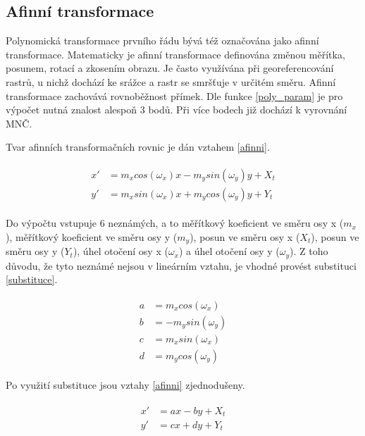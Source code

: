 \documentclass[thesis=M,czech]{FITthesis}[2012/06/26]
\begin{document}
\subsection{Afinní transformace}
Polynomická transformace prvního řádu bývá též označována jako afinní transformace. Matematicky je afinní transformace definována změnou měřítka, posunem, rotací a zkosením obrazu. Je často využívána při georeferencování rastrů, u nichž dochází ke srážce a rastr se smršťuje v určitém směru. Afinní transformace zachovává rovnoběžnost přímek. Dle funkce \eqref{poly_param} je pro výpočet nutná znalost alespoň 3 bodů.  Při více bodech již dochází k vyrovnání MNČ. 

Tvar afinních transformačních rovnic je dán vztahem \eqref{afinni}.

\begin{align}  \label{afinni} 
\begin{split}
x' &= m_x cos(\omega_x) x - m_y sin(\omega_y) y + X_t \\
y' &= m_x sin(\omega_x) x + m_y cos(\omega_y) y + Y_t
\end{split}
\end{align}

Do výpočtu vstupuje 6 neznámých, a to měřítkový koeficient ve směru osy x (\textit{$m_x$}), měřítkový koeficient ve směru osy y (\textit{$m_y$}), posun ve směru osy x (\textit{$X_t$}), posun ve směru osy y (\textit{$Y_t$}), úhel otočení osy x (\textit{$\omega_x$}) a úhel otočení osy y (\textit{$\omega_y$}). Z toho důvodu, že tyto neznámé nejsou v lineárním vztahu, je vhodné provést substituci \eqref{substituce}.

\begin{align}  \label{substituce} 
\begin{split}
a &= m_x cos(\omega_x) \\
b &= - m_y sin(\omega_y) \\
c &= m_x sin(\omega_x)\\
d &= m_y cos(\omega_y)
\end{split}
\end{align}

Po využití substituce jsou vztahy \eqref{afinni} zjednodušeny.

\begin{align}  \label{afinni_sub} 
\begin{split}
x' &= ax - by + X_t \\
y' &= cx + dy + Y_t
\end{split}
\end{align}
\end{document}
